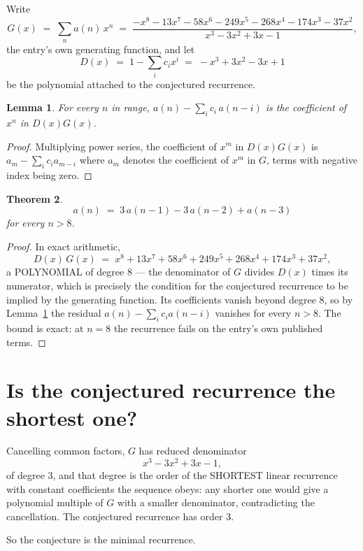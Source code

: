 \documentclass[11pt,a4paper]{article}
\theoremstyle{plain}
\newtheorem{theorem}{Theorem}
\newtheorem{lemma}[theorem]{Lemma}
\theoremstyle{definition}
\begin{document}
Write
\[
G(x)\;=\;\sum_{n}a(n)\,x^{n}\;=\;\frac{- x^{8} - 13 x^{7} - 58 x^{6} - 249 x^{5} - 268 x^{4} - 174 x^{3} - 37 x^{2}}{x^{3} - 3 x^{2} + 3 x - 1},
\]
the entry's own generating function, and let
\[
D(x)\;=\;1-\sum_i c_i x^{i}\;=\;- x^{3} + 3 x^{2} - 3 x + 1
\]
be the polynomial attached to the conjectured recurrence.

\begin{lemma}\label{lem:key}
For every $n$ in range, $a(n)-\sum_i c_i\,a(n-i)$ is the coefficient of $x^{n}$ in
$D(x)G(x)$.
\end{lemma}

\begin{proof}
Multiplying power series, the coefficient of $x^{m}$ in $D(x)G(x)$ is
$a_m-\sum_i c_i a_{m-i}$ where $a_m$ denotes the coefficient of $x^{m}$ in $G$, terms with
negative index being zero.
\end{proof}

\begin{theorem}
\[
a(n)\;=\;3\,a(n-1) - 3\,a(n-2) + a(n-3)
\]
for every $n>8$.
\end{theorem}

\begin{proof}
In exact arithmetic,
\[
D(x)\,G(x)\;=\;x^{8} + 13 x^{7} + 58 x^{6} + 249 x^{5} + 268 x^{4} + 174 x^{3} + 37 x^{2},
\]
a POLYNOMIAL of degree $8$ --- the denominator of $G$ divides $D(x)$ times its numerator,
which is precisely the condition for the conjectured recurrence to be implied by the
generating function. Its coefficients vanish beyond degree $8$, so by
Lemma~\ref{lem:key} the residual $a(n)-\sum_ic_ia(n-i)$ vanishes for every
$n>8$. The bound is exact: at $n=8$ the recurrence fails on the entry's own published terms.
\end{proof}

\section{Is the conjectured recurrence the shortest one?}

Cancelling common factors, $G$ has reduced denominator
\[
x^{3} - 3 x^{2} + 3 x - 1,
\]
of degree $3$, and that degree is the order of the SHORTEST linear recurrence with
constant coefficients the sequence obeys: any shorter one would give a polynomial multiple of
$G$ with a smaller denominator, contradicting the cancellation. The conjectured recurrence has
order $3$.

So the conjecture is the minimal recurrence.
\end{document}
